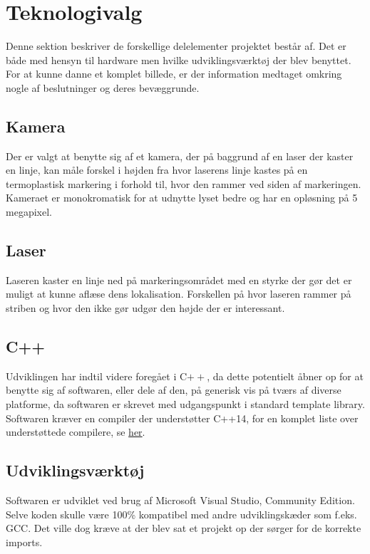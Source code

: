 \section{Teknologivalg}
Denne sektion beskriver de forskellige delelementer projektet består af. Det er både med hensyn til hardware men hvilke udviklingsværktøj der blev benyttet. For at kunne danne et komplet billede, er der information medtaget omkring nogle af beslutninger og deres bevæggrunde. 

\subsection{Kamera}
Der er valgt at benytte sig af et kamera, der på baggrund af en laser der kaster en linje, kan måle forskel i højden fra hvor laserens linje kastes på en termoplastisk markering i forhold til, hvor den rammer ved siden af markeringen.
Kameraet er monokromatisk for at udnytte lyset bedre og har en opløsning på 5 megapixel.

\subsection{Laser}
Laseren kaster en linje ned på markeringsområdet med en styrke der gør det er muligt at kunne aflæse dens lokalisation. Forskellen på hvor laseren rammer på striben og hvor den ikke gør udgør den højde der er interessant.

\subsection{C++}
Udviklingen har indtil videre foregået i C$++$, da dette potentielt åbner op for at benytte sig af softwaren, eller dele af den, på generisk vis på tværs af diverse platforme, da softwaren er skrevet med udgangspunkt i standard template library.
Softwaren kræver en compiler der understøtter C++14, for en komplet liste over understøttede compilere, se \href{http://en.cppreference.com/w/cpp/compiler_support}{her}.

\subsection{Udviklingsværktøj}
Softwaren er udviklet ved brug af Microsoft Visual Studio, Community Edition. Selve koden skulle være 100\% kompatibel med andre udviklingskæder som f.eks. GCC. Det ville dog kræve at der blev sat et projekt op der sørger for de korrekte imports.

